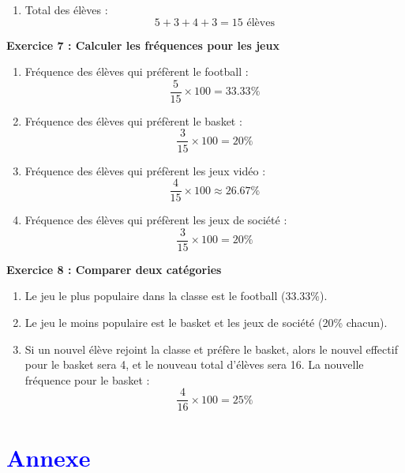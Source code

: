 \documentclass{article}
\begin{document}
\begin{tcolorbox}[colback=green!10!white, colframe=green!75!black, title=\textcolor{white}{Exercices}]
\begin{enumerate}
    \item Total des élèves :
    \[
    5 + 3 + 4 + 3 = 15 \text{ élèves}
    \]
\end{enumerate}

\vspace{0.5cm}

\textbf{Exercice 7 : Calculer les fréquences pour les jeux}
\begin{enumerate}
    \item Fréquence des élèves qui préfèrent le football :
    \[
    \frac{5}{15} \times 100 = 33.33\%
    \]
    
    \item Fréquence des élèves qui préfèrent le basket :
    \[
    \frac{3}{15} \times 100 = 20\%
    \]

    \item Fréquence des élèves qui préfèrent les jeux vidéo :
    \[
    \frac{4}{15} \times 100 \approx 26.67\%
    \]

    \item Fréquence des élèves qui préfèrent les jeux de société :
    \[
    \frac{3}{15} \times 100 = 20\%
    \]
\end{enumerate}

\end{tcolorbox}

\begin{tcolorbox}[colback=green!10!white, colframe=green!75!black, title=\textcolor{white}{Exercices}]

\textbf{Exercice 8 : Comparer deux catégories}
\begin{enumerate}
    \item Le jeu le plus populaire dans la classe est le football (33.33\%).
    
    \item Le jeu le moins populaire est le basket et les jeux de société (20\% chacun).
    
    \item Si un nouvel élève rejoint la classe et préfère le basket, alors le nouvel effectif pour le basket sera 4, et le nouveau total d'élèves sera 16. La nouvelle fréquence pour le basket :
    \[
    \frac{4}{16} \times 100 = 25\%
    \]
\end{enumerate}
\end{tcolorbox}

\newpage
\section{\textcolor{blue}{Annexe}}
\end{document}

